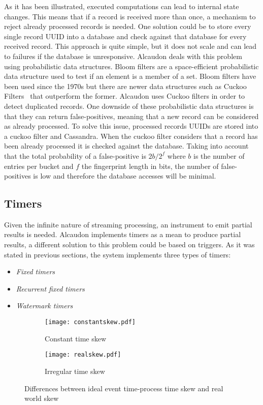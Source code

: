 As it has been illustrated, executed computations can lead to internal state
changes. This means that if a record is received more than once, a mechanism to
reject already processed records is needed. One solution could be to store every
single record \acs{UUID} into a database and check against that database for
every received record. This approach is quite simple, but it does not scale and
can lead to failures if the database is unresponsive. Alcaudon deals with this
problem using probabilistic data structures. Bloom filters are a space-efficient
probabilistic data structure used to test if an element is a member of a set.
Bloom filters have been used since the 1970s but there are newer data structures
such as Cuckoo Filters~\cite{cuckoo} that outperform the former. Alcaudon uses
Cuckoo filters in order to detect duplicated records. One downside of these
probabilistic data structures is that they can return false-positives, meaning
that a new record can be considered as already processed. To solve this
issue, processed records \acs{UUID}s are stored into a cuckoo filter and
Cassandra. When the cuckoo filter considers that a record has been already
processed it is checked against the database. Taking into account that the total
probability of a false-positive is $2b/2^{f}$ where $b$ is the number of entries
per bucket and $f$ the fingerprint length in bits, the number of false-positives
is low and therefore the database accesses will be minimal.

\subsection{Timers}

Given the infinite nature of streaming processing, an instrument to
emit partial results is needed. Alcaudon implements timers as a mean
to produce partial results, a different solution to this problem could
be based on triggers. As it was stated in previous sections, the system
implements three types of timers:

\begin{itemize}
\item \textit{Fixed timers}
\item \textit{Recurrent fixed timers}
\item \textit{Watermark timers}
\end{itemize}


\begin{figure}
\centering
\begin{subfigure}{.5\textwidth}
  \centering
  \texttt{[image: constantskew.pdf]}
  \caption{Constant time skew}
  \label{fig:constantskew}
\end{subfigure}%
\begin{subfigure}{.5\textwidth}
  \centering
  \texttt{[image: realskew.pdf]}
  \caption{Irregular time skew}
  \label{fig:randomskew}
\end{subfigure}
\caption{Differences between ideal event time-process time skew and real world skew}
\label{fig:skew}
\end{figure}

